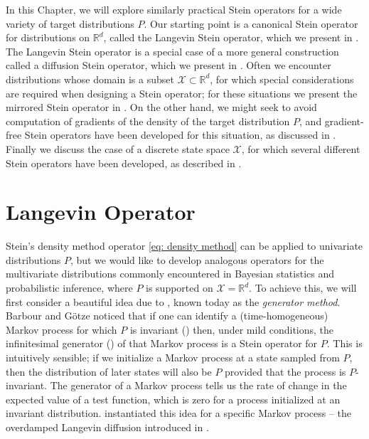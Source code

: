 \documentclass[12pt,paper=letter]{scrreprt}
\def\reals{\mathbb{R}} %
\newcommand{\xset}[0]{\mathcal{X}} %
\begin{document}
In this Chapter, we will explore similarly practical Stein operators for a wide variety of target distributions $P$.
Our starting point is a canonical Stein operator for distributions on $\reals^d$, called the Langevin Stein operator, which we present in .
The Langevin Stein operator is a special case of a more general construction called a diffusion Stein operator, which we present in .
Often we encounter distributions whose domain is a subset $\xset \subset \reals^d$, for which special considerations are required when designing a Stein operator; for these situations we present the mirrored Stein operator in .
On the other hand, we might seek to avoid computation of gradients of the density of the target distribution $P$, and gradient-free Stein operators have been developed for this situation, as discussed in .
Finally we discuss the case of a discrete state space $\xset$, for which several different Stein operators have been developed, as described in .



\section{Langevin Operator}
\label{sec: Lang Stein}

Stein's density method operator \cref{eq: density method} can be applied to univariate distributions $P$, but we would like to develop analogous operators for the multivariate distributions commonly encountered in Bayesian statistics and probabilistic inference, where $P$ is supported on $\xset = \reals^d$.
To achieve this, we will first consider a beautiful idea due to \citet{barbour1988stein,barbour1990stein,gotze1991rate}, known today as the \emph{generator method}.
Barbour and G\"{o}tze noticed that if one can identify a (time-homogeneous) Markov process for which $P$ is invariant () then, under mild conditions, the infinitesimal generator () of that Markov process is a Stein operator for $P$. %
This is intuitively sensible; if we initialize a Markov process at a state sampled from $P$, then the distribution of later states will also be $P$ provided that the process is $P$-invariant.
The generator of a Markov process tells us the rate of change in the expected value of a test function, which is zero for a process initialized at an invariant distribution.
\citet{gorham2015measuring} instantiated this idea for a specific Markov process -- the overdamped Langevin diffusion introduced in .
\end{document}
